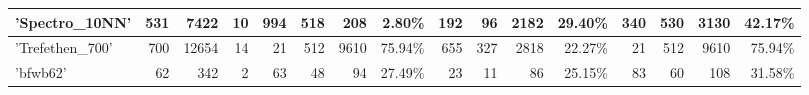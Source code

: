 \begin{table}[]
{\begin{tabular}{|l|r|r|r|r|r|r|r|r|r|r|r|r|r|r|r|}
\hline
'Spectro\_10NN'               & 531                                                     & 7422                                                & 10                                                       & 994                     & 518                     & 208                                                                           & 2.80\%                                                                           & 192                     & 96                      & 2182                                                                           & 29.40\%                                                                          & 340                     & 530                     & 3130                                                                           & 42.17\%                                                                           \\ 
\hline
'Trefethen\_700'              & 700                                                     & 12654                                               & 14                                                       & 21                      & 512                     & 9610                                                                          & 75.94\%                                                                          & 655                     & 327                     & 2818                                                                           & 22.27\%                                                                          & 21                      & 512                     & 9610                                                                           & 75.94\%                                                                           \\ 
\hline
'bfwb62'                      & 62                                                      & 342                                                 & 2                                                        & 63                      & 48                      & 94                                                                            & 27.49\%                                                                          & 23                      & 11                      & 86                                                                             & 25.15\%                                                                          & 83                      & 60                      & 108                                                                            & 31.58\%                                                                           \\ 

\end{tabular}}
\end{table}
